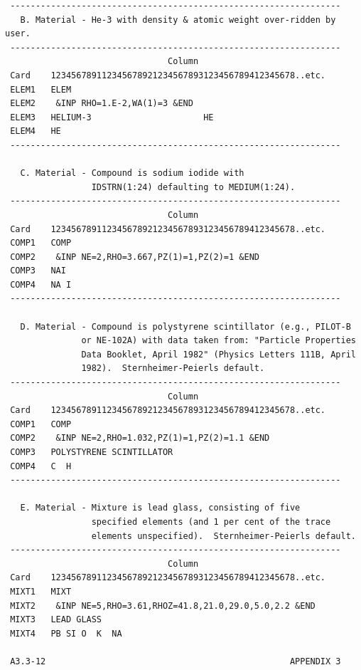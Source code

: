 \newpage  {} \begin{verbatim}
 -----------------------------------------------------------------
   B. Material - He-3 with density & atomic weight over-ridden by user.
 -----------------------------------------------------------------
                                Column
 Card    123456789112345678921234567893123456789412345678..etc.
 ELEM1   ELEM
 ELEM2    &INP RHO=1.E-2,WA(1)=3 &END
 ELEM3   HELIUM-3                      HE
 ELEM4   HE
 -----------------------------------------------------------------

   C. Material - Compound is sodium iodide with
                 IDSTRN(1:24) defaulting to MEDIUM(1:24).
 -----------------------------------------------------------------
                                Column
 Card    123456789112345678921234567893123456789412345678..etc.
 COMP1   COMP
 COMP2    &INP NE=2,RHO=3.667,PZ(1)=1,PZ(2)=1 &END
 COMP3   NAI
 COMP4   NA I
 -----------------------------------------------------------------

   D. Material - Compound is polystyrene scintillator (e.g., PILOT-B
               or NE-102A) with data taken from: "Particle Properties
               Data Booklet, April 1982" (Physics Letters 111B, April
               1982).  Sternheimer-Peierls default.
 -----------------------------------------------------------------
                                Column
 Card    123456789112345678921234567893123456789412345678..etc.
 COMP1   COMP
 COMP2    &INP NE=2,RHO=1.032,PZ(1)=1,PZ(2)=1.1 &END
 COMP3   POLYSTYRENE SCINTILLATOR
 COMP4   C  H
 -----------------------------------------------------------------

   E. Material - Mixture is lead glass, consisting of five
                 specified elements (and 1 per cent of the trace
                 elements unspecified).  Sternheimer-Peierls default.
 -----------------------------------------------------------------
                                Column
 Card    123456789112345678921234567893123456789412345678..etc.
 MIXT1   MIXT
 MIXT2    &INP NE=5,RHO=3.61,RHOZ=41.8,21.0,29.0,5.0,2.2 &END
 MIXT3   LEAD GLASS
 MIXT4   PB SI O  K  NA

 A3.3-12                                                APPENDIX 3
\end{verbatim}
